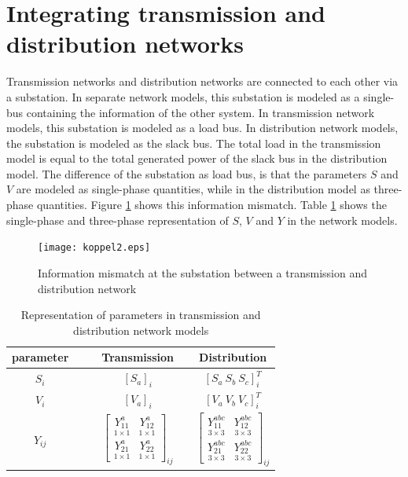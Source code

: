 \documentclass[10pt,journal]{article}
\begin{document}
\section{Integrating transmission and distribution networks}
Transmission networks and distribution networks are connected to each other via a substation. In separate network models, this substation is modeled as a single-bus containing the information of the other system. In transmission network models, this substation is modeled as a load bus. In distribution network models, the substation is modeled as the slack bus. The total load in the transmission model is equal to the total generated power of the slack bus in the distribution model. The difference of the substation as load bus, is that the parameters $S$ and $V$ are modeled as single-phase quantities, while in the distribution model as three-phase quantities. Figure \ref{fig:boundary} shows this information mismatch. Table \ref{tab:substationbus} shows the single-phase and three-phase representation of $S$, $V$ and $Y$ in the network models. 
\begin{figure}
    \centering
    \texttt{[image: koppel2.eps]}
    \caption{Information mismatch at the substation between a transmission and distribution network}
    \label{fig:boundary}
\end{figure}
\begin{table}[htbp]
\renewcommand{\arraystretch}{1.5}
\centering
\caption{Representation of parameters in transmission and distribution network models}\vspace{1.5ex}
\label{tab:substationbus}
\begin{tabular}{cccccc}
\toprule
parameter  &&& \multicolumn{1}{c}{Transmission} && \multicolumn{1}{c}{Distribution} \\ \hline
$S_i$ &&& $[S_a]_i$               && $\left[ S_a \ S_b \ S_c \right]_i^T$          \\
$V_i$  &&& $[V_a]_i$             && $\left[ V_a \ V_b \ V_c \right]_i^T$            \\
$Y_{ij}$ &&& $\begin{bmatrix}
              \underset{\scriptscriptstyle 1\times 1}{Y^{a}_{11}} &  \underset{\scriptscriptstyle 1\times 1}{Y^{a}_{12}} \\[1.5ex]
                \underset{\scriptscriptstyle 1\times 1}{Y^{a}_{21}} &  \underset{\scriptscriptstyle 1\times 1}{Y^{a}_{22}}
              \end{bmatrix}_{ij}$        && $\begin{bmatrix}
              \underset{\scriptscriptstyle 3\times 3}{Y^{abc}_{11}} &  \underset{\scriptscriptstyle 3\times 3}{Y^{abc}_{12}} \\[1.5ex]
                \underset{\scriptscriptstyle 3\times 3}{Y^{abc}_{21}} &  \underset{\scriptscriptstyle 3\times 3}{Y^{abc}_{22}}
              \end{bmatrix}_{ij}$          \\      
\toprule
\end{tabular}
\end{table}
\end{document}
